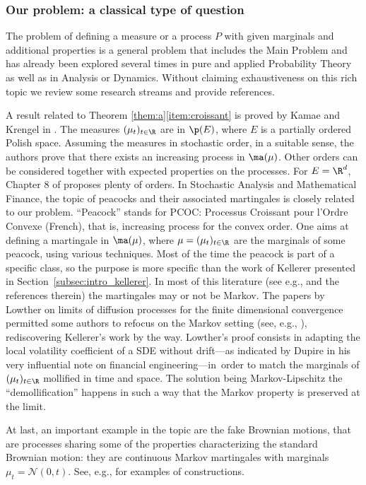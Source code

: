 \subsubsection*{Our problem: a classical type of question} The problem of defining a measure or a process $P$ with given marginals and additional properties is a general problem that includes the Main Problem and has already been explored several times in pure and applied Probability Theory as well as in Analysis or Dynamics. Without claiming exhaustiveness on this rich topic we review some research streams and provide references.

A result related to Theorem \ref{them:a}\eqref{item:croissant} is proved by Kamae and Krengel in \cite{KaKr}. The measures $(\mu_t)_{t\in \R}$ are in $\p(E)$, where $E$ is a partially ordered Polish space. Assuming the measures in stochastic order, in a suitable sense, the authors prove that there exists an increasing process in $\ma(\mu)$. Other orders can be considered together with expected properties on the processes. For $E=\R^d$, Chapter 8 of \cite{SS} proposes plenty of orders. In Stochastic Analysis and Mathematical Finance, the topic of peacocks and their associated martingales is closely related to our problem. ``Peacock'' stands for PCOC: Processus Croissant pour l'Ordre Convexe (French), that is, increasing process for the convex order. One aims at defining a martingale in $\ma(\mu)$, where $\mu=(\mu_t)_{t\in \R}$ are the marginals of some peacock, using various techniques. Most of the time the peacock is part of a specific class, so the purpose is more specific than the work of Kellerer presented in Section~\ref{subsec:intro_kellerer}. In most of this literature (see e.g., \cite{Gy,Dupire,BrSh,MaYo02,Ju_ejp,HTT,HiRo13,Hob16,pages} and the references therein) the martingales may or not be Markov. The papers by Lowther \cite{Low,Low2} on limits of diffusion processes for the finite dimensional convergence permitted some authors to refocus on the Markov setting (see, e.g., \cite{BHS,HiRoYo14,Ju_seminaire}), rediscovering Kellerer's work by the way. Lowther's proof consists in adapting the local volatility coefficient of a SDE without drift---as indicated by Dupire in his very influential note \cite{Dupire} on financial engineering---in~order to match the marginals of $(\mu_t)_{t\in \R}$ mollified in time and space. The solution being Markov-Lipschitz the ``demollification'' happens in such a way that the Markov property is preserved at the limit.

At last, an important example in the topic are the fake Brownian motions, that are processes sharing some of the properties characterizing the standard Brownian motion: they are continuous Markov martingales with marginals $\mu_t=\mathcal{N}(0,t)$. See, e.g., \cite{MaYo02,HaKl,Albin,Ol,Hob_fake,HTT} for examples of constructions.


